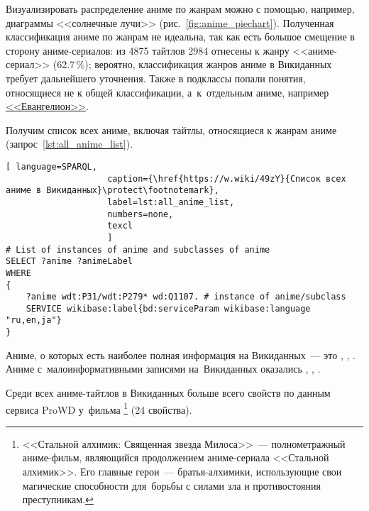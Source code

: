 Визуализировать распределение аниме по жанрам можно с помощью, 
например, диаграммы <<солнечные лучи>> 
(рис.~\ref{fig:anime_piechart}). 
%
Полученная классификация аниме по жанрам не идеальна, 
так как есть большое смещение в сторону аниме-сериалов: 
из \num{4875} тайтлов \num{2984} отнесены к жанру <<аниме-сериал>> (\num{62,7}\,\%); 
вероятно, классификация жанров аниме в Викиданных требует дальнейшего уточнения. 
Также в подклассы попали понятия, относящиеся не к общей классификации, 
а~к~отдельным аниме, например \href{https://w.wiki/4L5p}{<<Евангелион>>}.



\newpage
Получим список всех аниме, включая тайтлы, относящиеся к жанрам аниме (запрос~\ref{lst:all_anime_list}).

\begin{lstlisting}[ language=SPARQL, 
                    caption={\href{https://w.wiki/49zY}{Список всех аниме в Викиданных}\protect\footnotemark},
                    label=lst:all_anime_list,
                    numbers=none,
                    texcl 
                    ]
# List of instances of anime and subclasses of anime
SELECT ?anime ?animeLabel
WHERE
{
    ?anime wdt:P31/wdt:P279* wd:Q1107. # instance of anime/subclass
    SERVICE wikibase:label{bd:serviceParam wikibase:language "ru,en,ja"}
}
\end{lstlisting}%

Аниме, о которых есть наиболее полная информация на Викиданных~--- 
это , , 
. 
Аниме с~малоинформативными записями на~Викиданных оказались 
, 
, 
.

Среди всех аниме-тайтлов в Викиданных больше всего свойств по данным сервиса 
ProWD\autocite{anime_prowd} у~фильма \footnote{%
%
    <<Стальной алхимик: Священная звезда Милоса>>~--- полнометражный аниме-фильм, 
    являющийся продолжением аниме-сериала <<Стальной алхимик>>. 
    Его главные герои~--- братья-алхимики, 
    использующие свои магические способности 
    для~борьбы с силами зла и противостояния преступникам.%
} (\num{24} свойства).



